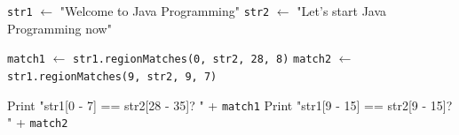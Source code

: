 \begin{algorithm}[H]
\caption{Compare Substrings Using \texttt{regionMatches()}}
\begin{algorithmic}[1]
\STATE \texttt{str1} $\gets$ "Welcome to Java Programming"
\STATE \texttt{str2} $\gets$ "Let's start Java Programming now"

\STATE \texttt{match1} $\gets$ \texttt{str1.regionMatches(0, str2, 28, 8)}
\STATE \texttt{match2} $\gets$ \texttt{str1.regionMatches(9, str2, 9, 7)}

\STATE Print "str1[0 - 7] == str2[28 - 35]? " + \texttt{match1}
\STATE Print "str1[9 - 15] == str2[9 - 15]? " + \texttt{match2}
\end{algorithmic}
\end{algorithm}
